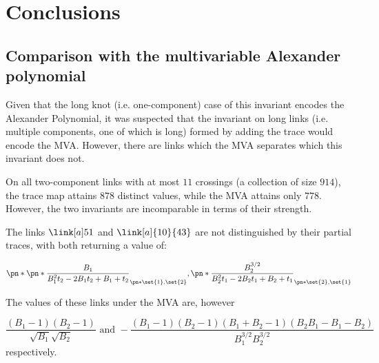 \chapter{Conclusions}\label{ch:conclusions}

\section{Comparison with the multivariable Alexander polynomial}

Given that the long knot (i.e. one-component) case of this invariant
encodes the Alexander Polynomial, it was suspected that the invariant on long
links (i.e. multiple components, one of which is long) formed by adding the
trace would encode the \ac{MVA}. However, there are links which the \ac{MVA}
separates which this invariant does not.

On all two-component links with at most $11$ crossings (a collection of size
$914$), the trace map attains $878$ distinct values, while the MVA attains only
$778$. However, the two invariants are incomparable in terms of their strength.

The links $\link[a]51$ and $\link[a]{10}{43}$ are not distinguished by their
partial traces, with both returning a value of:

\begin{equation}
        \pn*{
                \pn*{
                        \frac{B_1}{B_1^2 t_2 -2 B_1 t_2 +B_1+t_2}
                }_{\pn*{\set{1},\set{2}}},
                \pn*{
                        \frac{B_2^{3/2}}{B_2^2 t_1 -2 B_2 t_1 +B_2+t_1}
                }_{\pn*{\set{2},\set{1}}}
}
\end{equation}

The values of these links under the \ac{MVA} are, however

\begin{equation}
        \frac{\left(B_1-1\right) \left(B_2-1\right)}{\sqrt{B_1} \sqrt{B_2}}
        \text{ and }
        -\frac{\left(B_1-1\right) \left(B_2-1\right) \left(B_1+B_2-1\right)
        \left(B_2 B_1-B_1-B_2\right)}{B_1^{3/2} B_2^{3/2}}
\end{equation}
respectively.

